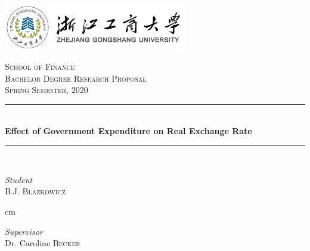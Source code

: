 \documentclass[a4paper,UTF8, 12pt]{article}
\begin{document}

\begin{titlepage} %
	\newcommand{\HRule}{\rule{\linewidth}{0.5mm}} %
	
	\center %
	\includegraphics[width=0.6\textwidth]{ZJGS_logo}
     \vskip 1cm
	
	\textsc{\LARGE School of Finance}\\[1.5cm] %
	
	\textsc{\LARGE Bachelor Degree Research Proposal}\\[0.5cm] %
	
	\textsc{\large Spring Semester, 2020}\\[0.5cm] %
	
	
	\HRule\\[0.4cm]
	
	{\huge\bfseries Effect of Government Expenditure on Real Exchange Rate}\\[0.4cm] %
	
	\HRule\\[1.5cm]
	
	
	\begin{minipage}{0.4\textwidth}
		\begin{center}
			\large
			\textit{Student}\\
			B.J. \textsc{Blazkowicz} %
		\end{center}
	\end{minipage}
	 cm
	\begin{minipage}{0.4\textwidth}
		\begin{center}
			\large
			\textit{Supervisor}\\
			Dr. Caroline \textsc{Becker} %
		\end{center}
	\end{minipage}
	

\end{titlepage}
\end{document}

